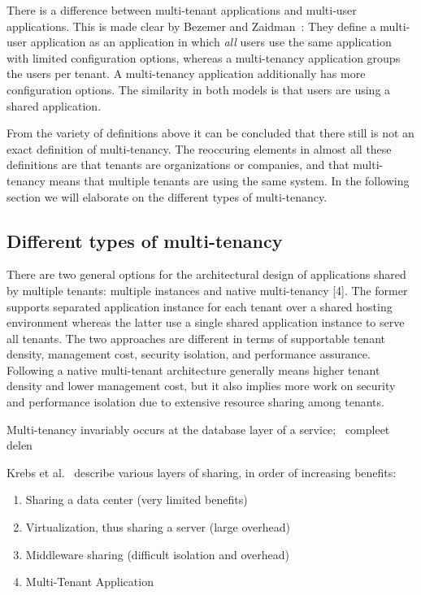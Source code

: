 There is a difference between multi-tenant applications and multi-user applications. This is made clear by Bezemer and Zaidman~\cite{bezemer2010multi}: They define a multi-user application as an application in which \emph{all} users use the same application with limited configuration options, whereas a multi-tenancy application groups the users per tenant. A multi-tenancy application additionally has more configuration options. The similarity in both models is that users are using a shared application. %

From the variety of definitions above it can be concluded that there still is not an exact definition of multi-tenancy. The reoccuring elements in almost all these definitions are that tenants are organizations or companies, and that multi-tenancy means that multiple tenants are using the same system. In the following section we will elaborate on the different types of multi-tenancy. 

\subsection{Different types of multi-tenancy}

There are two general options for the architectural design of applications shared by multiple tenants: multiple instances and native multi-tenancy [4]. The former supports separated application instance for each tenant over a shared hosting environment whereas the latter use a single shared application instance to serve all tenants. The two approaches are different in terms of supportable tenant density, management cost, security isolation, and performance assurance. Following a native multi-tenant architecture generally means higher tenant density and lower management cost, but it also implies more work on security and performance isolation due to extensive resource sharing among tenants.~\cite{lin2009feedback}



Multi-tenancy invariably occurs at the database layer of a service;~\cite{aulbach2008multi}
compleet delen~\cite{aulbach2009comparison}


Krebs et al.~\cite{krebs2012architecture} describe various layers of sharing, in order of increasing benefits:
\begin{enumerate}
\item Sharing a data center (very limited benefits)
\item Virtualization, thus sharing a server (large overhead)
\item Middleware sharing (difficult isolation and overhead)
\item Multi-Tenant Application
\end{enumerate}

